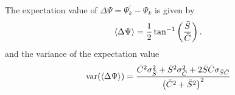 \documentclass[12pt]{article}
\begin{document}
\newpage

\noindent
The expectation value of $\Delta\Psi=\Psi^\prime_k - \Psi_k$ is given by
\begin{equation}
\langle\Delta\Psi\rangle
={1\over2}\tan^{-1}\left({\bar S\over\bar C}\right).
\end{equation}
and the variance of the expectation value
\begin{equation}
{\mathrm{var}}(\langle\Delta\Psi\rangle) = 
{ \bar C^2\sigma_{\bar S}^2 + \bar S^2\sigma_{\bar C}^2
  + 2 \bar S\bar C \sigma_{\bar S \bar C} \over 
  \left(\bar C^2 + \bar S^2\right)^2 }
\end{equation}
\end{document}
